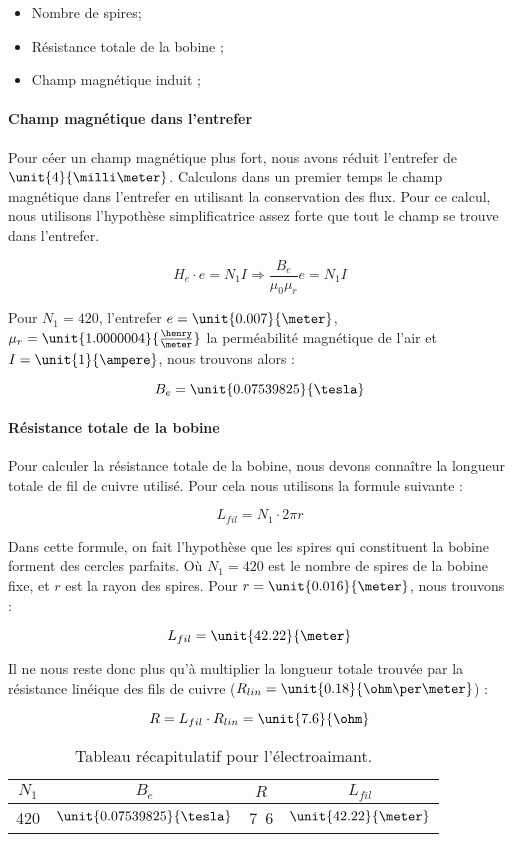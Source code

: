 \begin{itemize}
	\item Nombre de spires;
	\item Résistance totale de la bobine ;
	\item Champ magnétique induit ;
\end{itemize}

\paragraph{Champ magnétique dans l'entrefer}
Pour céer un champ magnétique plus fort, nous avons réduit l'entrefer de $\unit{4}{\milli\meter}$.
Calculons dans un premier temps le champ magnétique dans l'entrefer en 
utilisant la conservation des flux. Pour ce calcul, nous utilisons l'hypothèse simplificatrice
assez forte que tout le champ se trouve dans l'entrefer.

$$H_e \cdot e = N_1 I \Rightarrow \frac{B_e}{\mu_0 \mu_r} e = N_1 I$$

Pour $N_1 = 420$, l'entrefer $e = \unit{0.007}{\meter}$, $\mu_r = \unit{1.0000004}{\frac{\henry}{\meter}}$ la perméabilité magnétique
de l'air et $I = \unit{1}{\ampere}$, nous trouvons alors :

$$B_e = \unit{0.07539825}{\tesla}$$

\paragraph{Résistance totale de la bobine}
Pour calculer la résistance totale de la bobine, nous devons connaître la longueur totale de fil de cuivre utilisé.
Pour cela nous utilisons la formule suivante :

$$L_{fil} = N_1 \cdot 2\pi r$$  

Dans cette formule, on fait l'hypothèse que les spires qui constituent la bobine forment des cercles
parfaits.
Où $N_1 = 420$ est le nombre de spires de la bobine fixe, et $r$ est la rayon des spires. Pour
$r = \unit{0.016}{\meter}$, nous trouvons :

$$L_{fil} = \unit{42.22}{\meter}$$

Il ne nous reste donc plus qu'à multiplier la longueur totale trouvée par la résistance linéique des fils de cuivre
($R_{lin} = \unit{0.18}{\ohm\per\meter}$) :

$$R = L_{fil} \cdot R_{lin} = \unit{7.6}{\ohm}$$

\begin{table}[!htb]
	\centering
	\begin{tabular}{c|c|c|c}
		$N_1$ & $B_e$ & $R$ & $L_{fil}$ \\
		\hline
		420 & $\unit{0.07539825}{\tesla}$ & \unit{7.6}{\ohm} &  $\unit{42.22}{\meter}$\\
	\end{tabular}
	\caption{Tableau récapitulatif pour l'électroaimant.}
\end{table}

